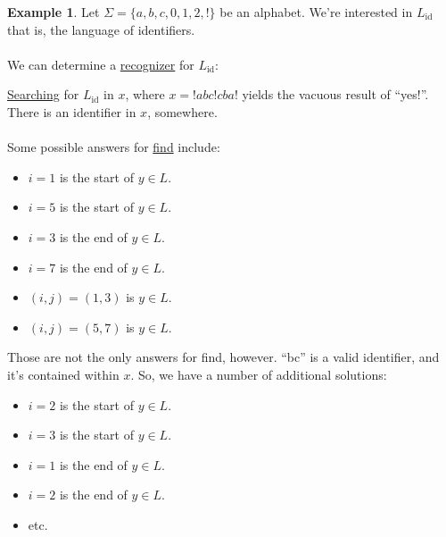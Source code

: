 \documentclass[]{article}
\theoremstyle{definition}
\newtheorem{ex}{Example}[section]
\begin{document}
				\begin{ex}
					Let $\Sigma = \{a, b, c, 0, 1, 2, !\}$ be an alphabet. We're interested in $L_{\text{id}}$ \textendash{} that is, the language of identifiers.
					\\ \\
					We can determine a \underline{recognizer} for $L_{\text{id}}$:
					\begin{center}
					\end{center}

					\underline{Searching} for $L_{\text{id}}$ in $x$, where $x = !abc!cba!$ yields the vacuous result of ``yes!''. There is an identifier in $x$, somewhere.
					\\ \\
					Some possible answers for \underline{find} include:
					\begin{itemize}
						\item $i = 1$ is the start of $y \in L$.
						\item $i = 5$ is the start of $y \in L$.
						\item $i = 3$ is the end of $y \in L$.
						\item $i = 7$ is the end of $y \in L$.
						\item $(i, j) = (1, 3)$ is $y \in L$.
						\item $(i, j) = (5, 7)$ is $y \in L$.
					\end{itemize}

					Those are not the only answers for find, however. ``bc'' is a valid identifier, and it's contained within $x$. So, we have a number of additional solutions:
					\begin{itemize}
						\item $i = 2$ is the start of $y \in L$.
						\item $i = 3$ is the start of $y \in L$.
						\item $i = 1$ is the end of $y \in L$.
						\item $i = 2$ is the end of $y \in L$.
						\item etc.
					\end{itemize}


\end{ex}
\end{document}
